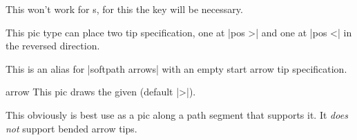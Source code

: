 \begin{multicols}{2}
\begin{description}
  This won't work for s,
  for this the  key will be necessary.
  
  This pic type can place two tip specification,
  one at |pos >| and one at |pos <| in the reversed direction.

\item[|softpath arrow|]
  This is an alias for |softpath arrows| with an empty start arrow tip specification.

%  
%
\end{description}
\begin{pictype}{arrow}{}
  This pic draws the given  (default |>|).
  
  This obviously is best use as a pic along a path segment that supports it.
  It \emph{does not} support bended arrow tips.
\begin{codeexample}[preamble=\usetikzlibrary{bending, ext.arrows-plus}]
\end{codeexample}
\end{pictype}


\end{multicols}
